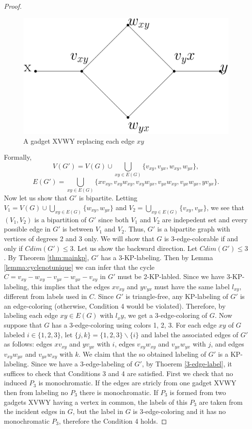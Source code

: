 \documentclass[12pt,a4paper,titlepage,openany]{report}
\begin{document}
\begin{proof}
\begin{figure}[h]
\begin{center}
\includegraphics[width=0.6\linewidth]{figures/gadget.png}
\end{center}
\caption{A gadget XVWY replacing each edge $xy$}\label{gadget}
\end{figure}
Formally,
$$V(G')= V(G)\cup
\bigcup_{xy\in E(G)} \{v_{xy}, v_{yx}, w_{xy}, w_{yx}\},$$
$$E(G')=\bigcup_{xy\in E(G)} \{xv_{xy}, v_{xy}w_{xy}, v_{xy}w_{yx}, v_{yx}w_{xy},v_{yx}w_{yx}, yv_{yx}\}.$$
Now let us show that $G'$ is bipartite. Letting $V_1=V(G)\cup
\bigcup_{xy\in E(G)} \{w_{xy},w_{yx}\}$ and $V_2=\bigcup_{xy\in E(G)} \{v_{xy},v_{yx}\}$, we see that $(V_1, V_2)$ is a bipartition of $G'$ since both $V_1$ and $V_2$ are indepedent set and every possible edge in $G'$ is between $V_1$ and $V_2$. Thus, $G'$ is a bipartite graph with vertices of degrees 2 and 3 only. We will show that $G$ is 3-edge-colorable if and only if $Cdim(G') 
\leq 3$.\newline
Let us show the backward direction. Let $Cdim(G')\leq 3$. By Theorem \ref{thm:mainkp}, $G'$ has a 3-KP-labeling. Then by Lemma \ref{lemma:cyclenotunique} we can infer that the cycle $C=v_{xy}-w_{xy}-v_{yx}-w_{yx}-v_{xy}$ in $G'$ must be 2-KP-labled. Since we have 3-KP-labeling, this implies that the edges $xv_{xy}$ and $yv_{yx}$ must have the same label $l_{xy}$, different from labels used in $C$. Since $G'$ is triangle-free, any KP-labeling of $G'$ is an edge-coloring (otherwise, Condition 4 would be violated). Therefore, by labeling each edge $xy \in E(G)$ with $l_xy$, we get a 3-edge-coloring of $G$.\newline
Now suppose that $G$ has a 3-edge-coloring using colors 1, 2, 3. For each edge $xy$ of $G$ labeled $i \in \{1, 2, 3\}$, let $\{j, k\} = \{1, 2, 3\} \backslash \{i\}$ and label the associated edges of $G'$ as follows: edges $xv_{xy}$ and $yv_{yx}$ with $i$, edges $v_{xy} w_{xy}$ and $v_{yx} w_{yx}$ with $j$, and edges $v_{xy} w_{yx}$ and $v_{yx} w_{xy}$ with $k$. We claim that the so obtained labeling of $G'$ is a KP-labeling. Since we have a 3-edge-labeling of $G'$, by Thoerem \ref{3-edge-label}, it suffices to check that Conditions 3 and 4 are satisfied. First we check that no induced $P_3$ is monochromatic. If the edges are stricly from one gadget XVWY then from labeling no $P_3$ there is monochromatic. If $P_3$ is formed from two gadgets XVWY having a vertex in common, the labels of this $P_3$ are taken from the incident edges in $G$, but the label in $G$ is 3-edge-coloring and it has no monochromatic $P_3$, therefore the Condition 4 holds.

\end{proof}
\end{document}
